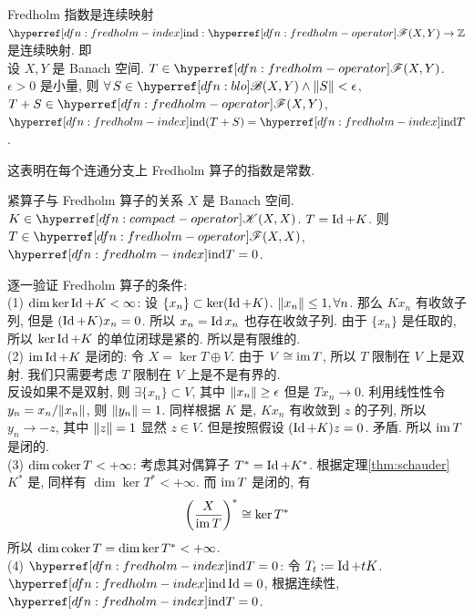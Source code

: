         \begin{thm}
            {Fredholm 指数是连续映射}
            \(\ind: \fred(X,Y)\to \Z\) 是连续映射. 即\\ 
            设 \(X,Y\) 是 Banach 空间. \(T\in\fred(X,Y)\). \(\epsilon>0\) 是小量, 则 \(\forall\,S\in\blo(X,Y)\land \norm{S}<\epsilon\), \(T+S\in\fred(X,Y)\), \(\ind(T+S)=\ind T\).
        \end{thm}

        \begin{rmk}
            [Dedicatia]
            这表明在每个连通分支上 Fredholm 算子的指数是常数. 
        \end{rmk}

        \begin{thm}
            {紧算子与 Fredholm 算子的关系}
            \(X\) 是 Banach 空间. \(K\in\cpt(X,X)\). \(T=\operatorname{Id}+K\). 则 \(T\in\fred(X,X)\), \(\ind T=0\).
        \end{thm}

        \begin{prf}
            逐一验证 Fredholm 算子的条件:\\
            (1) \(\dim\ker\operatorname{Id}+K<\infty\): 设 \(\{x_n\}\subset\ker(\operatorname{Id}+K)\). \(\norm{x_n}\leq 1,\forall n\). 那么 \(Kx_n\) 有收敛子列, 但是 \((\operatorname{Id}+K)x_n=0\). 
            所以 \(x_n=\operatorname{Id} x_n\) 也存在收敛子列. 由于 \(\{x_n\}\) 是任取的, 所以 \(\ker\operatorname{Id}+K\) 的单位闭球是紧的. 所以是有限维的.\\
            (2) \(\operatorname{im}\operatorname{Id}+K\) 是闭的: 令 \(X=\ker T\oplus V\). 由于 \(V\cong\operatorname{im} T\), 所以 \(T\) 限制在 \(V\) 上是双射. 我们只需要考虑 \(T\) 限制在 \(V\) 上是不是有界的. \\
            反设如果不是双射, 则 \(\exists\{x_n\}\subset V\), 其中 \(\norm{x_n}\geq\epsilon\) 但是 \(Tx_n\to 0\). 
            利用线性性令 \(y_n=x_n/\norm{x_n}\), 则 \(\norm{y_n}=1\). 同样根据 \(K\) 是\CompactOp{}, \(Kx_n\) 有收敛到 \(z\) 的子列, 所以 \(y_n\to -z\), 其中 \(\norm{z}=1\) 显然 \(z\in V\). 但是按照假设 \((\operatorname{Id}+K)z=0\). 矛盾. 所以 \(\operatorname{im} T\) 是闭的.\\
            (3) \(\dim\operatorname{coker} T<+\infty\): 考虑其对偶算子 \(T^*=\operatorname{Id}+K^*\). 根据定理\ref{thm:schauder} \(K^*\) 是\CompactOp{}, 同样有 \(\dim\ker T^*<+\infty\). 而 \(\operatorname{im} T\) 是闭的, 有 
            \[\qty(\frac{X}{\operatorname{im} T})^*\cong\ker T^* \]
            所以 \(\dim\operatorname{coker} T=\dim\ker T^*<+\infty\).\\
            (4) \(\ind T=0\): 令 \(T_t:=\operatorname{Id} +tK\). \(\ind\Id=0\), 根据连续性, \(\ind T=0\).
        \end{prf}

